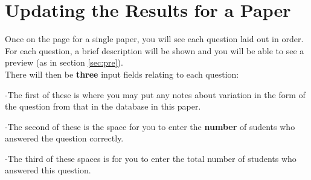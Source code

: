 \documentclass[12pt, a4paper, titlepage]{book}
\begin{document}
\section{Updating the Results for a Paper}
Once on the page for a single paper, you will see each question laid out in order. For each question, a brief description will be shown and you will be able to see a preview (as in section \ref{sec:pre}).
\\There will then be \textbf{three} input fields relating to each question:
\par -The first of these is where you may put any notes about variation in the form of the question from that in the database in this paper.
\par -The second of these is the space for you to enter the \textbf{number} of sudents who answered the question correctly.
\par -The third of these spaces is for you to enter the total number of students who answered this question.
\end{document}
